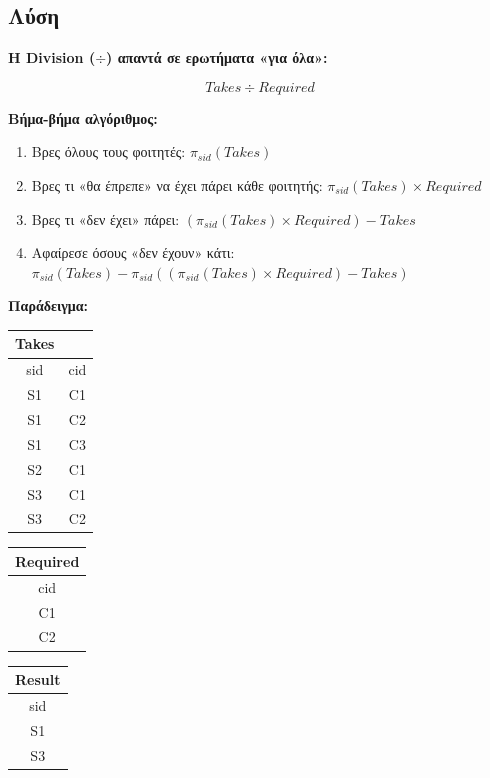 \subsection*{Λύση}

\textbf{Η Division ($\div$) απαντά σε ερωτήματα «για όλα»:}

$$Takes \div Required$$

\textbf{Βήμα-βήμα αλγόριθμος:}

\begin{enumerate}
    \item Βρες όλους τους φοιτητές: $\pi_{sid}(Takes)$
    \item Βρες τι «θα έπρεπε» να έχει πάρει κάθε φοιτητής: $\pi_{sid}(Takes) \times Required$
    \item Βρες τι «δεν έχει» πάρει: $(\pi_{sid}(Takes) \times Required) - Takes$
    \item Αφαίρεσε όσους «δεν έχουν» κάτι: $\pi_{sid}(Takes) - \pi_{sid}((\pi_{sid}(Takes) \times Required) - Takes)$
\end{enumerate}

\textbf{Παράδειγμα:}

\begin{center}
\begin{tabular}{cc}
\textbf{Takes} & \\
\toprule
sid & cid \\
\midrule
S1 & C1 \\
S1 & C2 \\
S1 & C3 \\
S2 & C1 \\
S3 & C1 \\
S3 & C2 \\
\bottomrule
\end{tabular}
\quad\quad
\begin{tabular}{c}
\textbf{Required} \\
\toprule
cid \\
\midrule
C1 \\
C2 \\
\bottomrule
\end{tabular}
\quad\quad
\begin{tabular}{c}
\textbf{Result} \\
\toprule
sid \\
\midrule
S1 \\
S3 \\
\bottomrule
\end{tabular}
\end{center}

